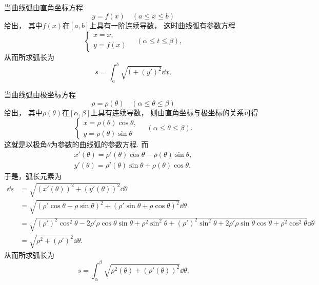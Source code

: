 当曲线弧由直角坐标方程\begin{equation*}
	y = f(x) \quad(a \leq x \leq b)
\end{equation*}给出，
其中\(f(x)\)在\([a,b]\)上具有一阶连续导数，
这时曲线弧有参数方程\begin{equation*}
	\left\{ \begin{array}{l}
		x = x, \\
		y = f(x)
	\end{array} \right.
	\quad(\alpha \leq t \leq \beta),
\end{equation*}
从而所求弧长为\begin{equation}
	s = \int_a^b \sqrt{1+(y')^2} \dd{x}.
\end{equation}

当曲线弧由极坐标方程\begin{equation*}
	\rho=\rho(\theta)
	\quad(\alpha \leq \theta \leq \beta)
\end{equation*}给出，
其中\(\rho(\theta)\)在\([\alpha,\beta]\)上具有连续导数，
则由直角坐标与极坐标的关系可得\begin{equation*}
	\left\{ \begin{array}{c}
		x = \rho(\theta) \cos\theta, \\
		y = \rho(\theta) \sin\theta
	\end{array} \right.
	\quad(\alpha \leq \theta \leq \beta).
\end{equation*}
这就是以极角\(\theta\)为参数的曲线弧的参数方程.
而\begin{gather*}
	x'(\theta) = \rho'(\theta) \cos\theta - \rho(\theta) \sin\theta, \\
	y'(\theta) = \rho'(\theta) \sin\theta + \rho(\theta) \cos\theta.
\end{gather*}
于是，弧长元素为\begin{align*}
	\dd{s}
	&= \sqrt{(x'(\theta))^2 + (y'(\theta))^2} \dd{\theta} \\
	&= \sqrt{(\rho' \cos\theta - \rho \sin\theta)^2
		+ (\rho' \sin\theta + \rho \cos\theta)^2} \dd{\theta} \\
	&= \sqrt{(\rho')^2\cos^2\theta-2\rho'\rho\cos\theta\sin\theta+\rho^2\sin^2\theta
		+ (\rho')^2\sin^2\theta+2\rho'\rho\sin\theta\cos\theta+\rho^2\cos^2\theta} \dd{\theta} \\
	&= \sqrt{\rho^2 + (\rho')^2} \dd{\theta}.
\end{align*}
从而所求弧长为\begin{equation}
	s = \int_\alpha^\beta \sqrt{\rho^2(\theta) + (\rho'(\theta))^2} \dd{\theta}.
\end{equation}

